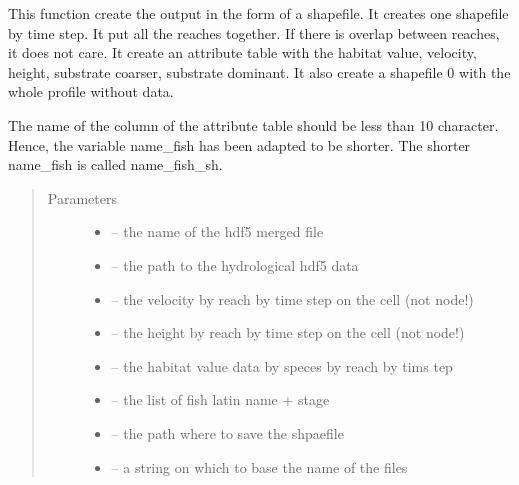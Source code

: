 \documentclass[letterpaper,10pt,english]{sphinxmanual}
\begin{document}
\begin{fulllineitems}
\label{\detokenize{index:src.calcul_hab.save_hab_shape}}
This function create the output in the form of a shapefile. It creates one shapefile by time step. It put
all the reaches together. If there is overlap between reaches, it does not care. It create an attribute table
with the habitat value, velocity, height, substrate coarser, substrate dominant. It also create a shapefile
0 with the whole profile without data.

The name of the column of the attribute table should be less than 10 character. Hence, the variable name\_fish
has been adapted to be shorter. The shorter name\_fish is called name\_fish\_sh.
\begin{quote}\begin{description}
\item[{Parameters}] \leavevmode\begin{itemize}
\item {} 
 -- the name of the hdf5 merged file

\item {} 
 -- the path to the hydrological hdf5 data

\item {} 
 -- the velocity by reach by time step on the cell (not node!)

\item {} 
 -- the height by reach by time step on the cell (not node!)

\item {} 
 -- the habitat value data by speces by reach by tims tep

\item {} 
 -- the list of fish latin name + stage

\item {} 
 -- the path where to save the shpaefile

\item {} 
 -- a string on which to base the name of the files


\end{itemize}
\end{description}
\end{quote}
\end{fulllineitems}
\end{document}
